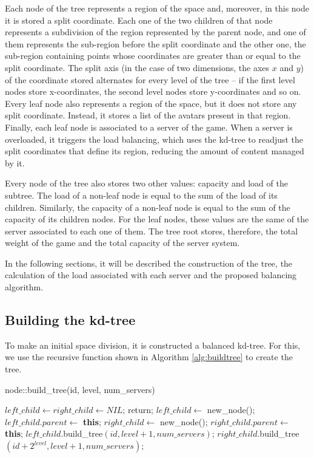 \documentclass[acmjacm]{acmtrans2m}
\begin{document}
Each node of the tree represents a region of the space and, moreover, in this node it is stored a split coordinate. Each one of the two children of that node represents a subdivision of the region represented by the parent node, and one of them represents the sub-region before the split coordinate and the other one, the sub-region containing points whose coordinates are greater than or equal to the split coordinate. The split axis (in the case of two dimensions, the axes $x$ and $y$) of the coordinate stored alternates for every level of the tree -- if the first level nodes store x-coordinates, the second level nodes store y-coordinates and so on. Every leaf node also represents a region of the space, but it does not store any split coordinate. Instead, it stores a list of the avatars present in that region. Finally, each leaf node is associated to a server of the game. When a server is overloaded, it triggers the load balancing, which uses the kd-tree to readjust the split coordinates that define its region, reducing the amount of content managed by it.

Every node of the tree also stores two other values: capacity and load of the subtree. The load of a non-leaf node is equal to the sum of the load of its children. Similarly, the capacity of a non-leaf node is equal to the sum of the capacity of its children nodes. For the leaf nodes, these values are the same of the server associated to each one of them. The tree root stores, therefore, the total weight of the game and the total capacity of the server system.

In the following sections, it will be described the construction of the tree, the calculation of the load associated with each server and the proposed balancing algorithm.

\subsection{Building the kd-tree}

To make an initial space division, it is constructed a balanced kd-tree. For this, we use the recursive function shown in Algorithm \ref{alg:buildtree} to create the tree.

\begin{algorithm}
\caption{node::build\_tree(id, level, num\_servers)}
\label{alg:buildtree}
\begin{algorithmic}
		\STATE $left\_child \leftarrow right\_child \leftarrow NIL$;
		\STATE return;
	\ELSE
		\STATE $left\_child \leftarrow$ new\_node();
		\STATE $left\_child.parent \leftarrow$ \textbf{this};
		\STATE $right\_child \leftarrow$ new\_node();
		\STATE $right\_child.parent \leftarrow$ \textbf{this};
		\STATE $left\_child$.build\_tree$(id, level + 1, num\_servers)$;
		\STATE $right\_child$.build\_tree$(id + 2^{level}, level + 1, num\_servers)$;
	\ENDIF
\end{algorithmic}
\end{algorithm}
\end{document}
